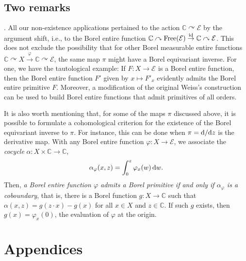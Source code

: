 \documentclass[12pt]{paper}
\numberwithin{equation}{section}
\theoremstyle{plain}
\theoremstyle{definition}
\newcommand{\C}{\mathbb{C}}
\newcommand{\holom}[1][]{\mathcal{E}_{#1}}
\newcommand{\free}{\mathrm{Free}}
\begin{document}
\subsection{Two remarks}
\label{subsect:two-remarks}

{.} All our non-existence applications pertained to the action
\(\C \curvearrowright \mathcal E\) by the argument shift, i.e., to the Borel entire function
\(\C\curvearrowright\free(\mathcal E) \stackrel{\rm id}\to\C\curvearrowright\mathcal E\).  This does
not exclude the possibility that for other Borel measurable entire functions
\(\C\curvearrowright X \stackrel{\varphi}\to\C\curvearrowright\mathcal E\), the same map \(\pi\)
might have a Borel equivariant inverse.  For one, we have the tautological example: If
\(F:X\to \holom\) is a Borel entire function, then the Borel entire function \(F'\) given by
\(x\mapsto F'_x\) evidently admits the Borel entire primitive \(F\). Moreover, a modification of the
original Weiss's construction~\cite{MR1422707} can be used to build Borel entire functions that admit
primitives of all orders.

\medskip{}  It is also worth mentioning that, for some of the maps \(\pi\) discussed
above, it is possible to formulate a cohomological criterion for the existence of the Borel
equivariant inverse to \(\pi\).  For instance, this can be done when \(\pi = {\rm d}/{\rm d}z\) is
the derivative map. With any Borel entire function \(\varphi\colon X\to\mathcal E\), we associate
the \emph{cocycle} \(\alpha\colon X\times \C \to \C\),
\[
  \alpha_\varphi (x, z) = \int_0^z \varphi_x(w) \, {\rm d}w.
\]
Then, \emph{a Borel entire function \(\varphi\) admits a Borel primitive if and only if
  \(\alpha_\varphi\) is a coboundary}, that is, there is a Borel function \(g\colon X\to \C\) such
that \(\alpha (x, z) = g(z\cdot x) - g(x)\) for all \(x\in X\) and \(z\in \C\). If such \(g\)
exists, then \(g(x)=\varphi_x(0)\), the evaluation of \(\varphi\) at the origin.




















\bigskip \bigskip

\appendix
\section*{Appendices}
\end{document}
